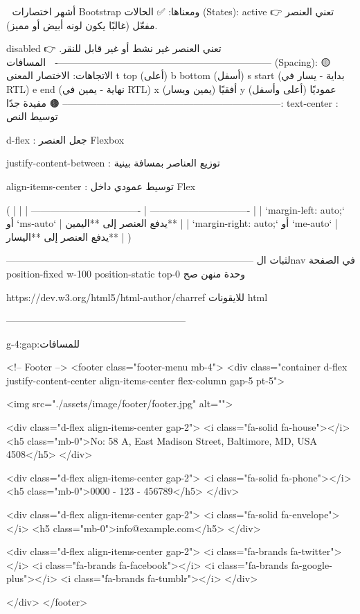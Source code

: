 🧠 أشهر اختصارات Bootstrap ومعناها:
✅ الحالات (States):
active 👉 تعني العنصر مفعّل (غالبًا يكون لونه أبيض أو مميز).

disabled 👉 تعني العنصر غير نشط أو غير قابل للنقر.
-------------------------------------------------------------------
🔵 المسافات (Spacing):
🟡 الاتجاهات:
الاختصار	المعنى
t	top (أعلى)
b	bottom (أسفل)
s	start (بداية - يسار في RTL)
e	end (نهاية - يمين في RTL)
x	أفقيًا (يمين ويسار)
y	عموديًا (أعلى وأسفل)
--------------------------------------------------------------------
🟤 مفيدة جدًا:
text-center : توسيط النص

d-flex : جعل العنصر Flexbox

justify-content-between : توزيع العناصر بمسافة بينية

align-items-center : توسيط عمودي داخل Flex

(
|  |
| ---------------------------------- | ------------------------------- |
| `margin-left: auto;` أو `ms-auto`  | يدفع العنصر إلى **اليمين**      |
| `margin-right: auto;` أو `me-auto` | يدفع العنصر إلى **اليسار**      |
)

-----------------------------------------------------------------------------
لثبات الnav في الصفحة 
position-fixed w-100
position-static top-0
وحدة منهن صح


https://dev.w3.org/html5/html-author/charref
للايقونات html


--------------------------------------------------------

g-4:gap:للمسافات 



<!-- Footer -->
<footer class="footer-menu mb-4">
  <div class="container d-flex justify-content-center align-items-center flex-column gap-5  pt-5">
    
    <img src="./assets/image/footer/footer.jpg" alt="">
    
    <div class="d-flex align-items-center gap-2">
      <i class="fa-solid fa-house"></i>
      <h5 class="mb-0">No: 58 A, East Madison Street, Baltimore, MD, USA 4508</h5>
    </div>
    
    <div class="d-flex align-items-center gap-2">
      <i class="fa-solid fa-phone"></i>
      <h5 class="mb-0">0000 - 123 - 456789</h5>
    </div>
    
    <div class="d-flex align-items-center gap-2">
      <i class="fa-solid fa-envelope"></i>
      <h5 class="mb-0">info@example.com</h5>
    </div>

    <div class="d-flex align-items-center gap-2">
      <i class="fa-brands fa-twitter"></i>
      <i class="fa-brands fa-facebook"></i>
      <i class="fa-brands fa-google-plus"></i>
      <i class="fa-brands fa-tumblr"></i>
    </div>
    
  </div>
</footer>